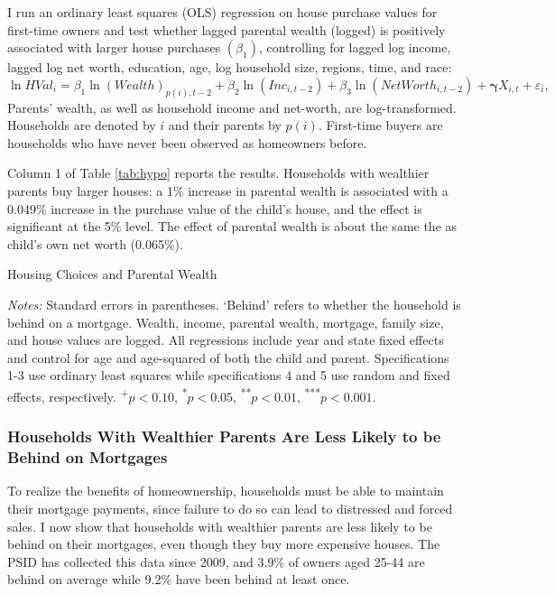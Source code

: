 \documentclass[12pt]{article}
\begin{document}
I run an ordinary least squares (OLS) regression on house purchase values for first-time owners and test whether lagged parental wealth (logged) is positively associated with larger house purchases $(\beta_1)$, controlling for lagged log income, lagged log net worth, education, age, log household size, regions, time, and race:
\begin{equation*}
\ln{HVal_{i}} = \beta_1 \ln(Wealth)_{p(i),t-2} + \beta_2 \ln(Inc_{i,t-2}) + \beta_3 \ln(NetWorth_{i,t-2}) + \mathbf{\gamma}{X_{i,t}} + \varepsilon_{i},
\end{equation*}
Parents' wealth, as well as household income and net-worth, are log-transformed. Households are denoted by $i$ and their parents by $p(i)$. First-time buyers are households who have never been observed as homeowners before.

Column 1 of Table \ref{tab:hypo} reports the results. Households with wealthier parents buy larger houses: a 1\% increase in parental wealth is associated with a 0.049\% increase in the purchase value of the child's house, and the effect is significant at the 5\% level. The effect of parental wealth is about the same the as child's own net worth (0.065\%).


\begin{table}
	\center
	\begin{threeparttable}
		\caption{Housing Choices and Parental Wealth}
		\label{tab:hypo}
		\small 
				

		{\begin{footnotesize}\begin{flushleft}
		\textit{Notes:} Standard errors in parentheses. `Behind' refers to whether the household is behind on a mortgage. Wealth, income, parental wealth, mortgage, family size, and house values are logged. All regressions include year and state fixed effects and control for age and age-squared of both the child and parent. Specifications 1-3 use ordinary least squares while specifications 4 and 5 use random and fixed effects, respectively. \textsuperscript{+}$p<0.10$, \textsuperscript{*}$p<0.05$, \textsuperscript{**}$p<0.01$, \textsuperscript{***}$p<0.001$.
		\end{flushleft}\end{footnotesize}}		
	\end{threeparttable}
\end{table}

\subsubsection{Households With Wealthier Parents Are Less Likely to be Behind on Mortgages} 
To realize the benefits of homeownership, households must be able to maintain their mortgage payments, since failure to do so can lead to distressed and forced sales. I now show that households with wealthier parents are less likely to be behind on their mortgages, even though they buy more expensive houses. The PSID has collected this data since 2009, and 3.9\% of owners aged 25-44 are behind on average while 9.2\% have been behind at least once.
\end{document}
